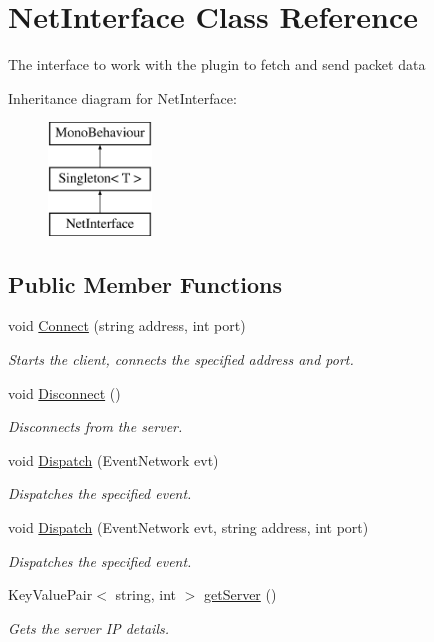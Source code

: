 \hypertarget{class_net_interface}{\section{Net\-Interface Class Reference}
\label{class_net_interface}
}


The interface to work with the plugin to fetch and send packet data  


Inheritance diagram for Net\-Interface\-:\begin{figure}[H]
\begin{center}
\leavevmode
\includegraphics[height=3.000000cm]{class_net_interface}
\end{center}
\end{figure}
\subsection*{Public Member Functions}
\begin{DoxyCompactItemize}
\item 
void \hyperlink{class_net_interface_a565fb35ea7ed5e364902aa8bd0bc6bf9}{Connect} (string address, int port)
\begin{DoxyCompactList}\small\item\em Starts the client, connects the specified address and port. \end{DoxyCompactList}\item 
void \hyperlink{class_net_interface_ae0be68e392f32d422325ac54fcaa7cae}{Disconnect} ()
\begin{DoxyCompactList}\small\item\em Disconnects from the server. \end{DoxyCompactList}\item 
void \hyperlink{class_net_interface_a3ed4f694a9f2083af9ea38ed2a554404}{Dispatch} (Event\-Network evt)
\begin{DoxyCompactList}\small\item\em Dispatches the specified event. \end{DoxyCompactList}\item 
void \hyperlink{class_net_interface_a0cf4580da2218baff890af79fd606722}{Dispatch} (Event\-Network evt, string address, int port)
\begin{DoxyCompactList}\small\item\em Dispatches the specified event. \end{DoxyCompactList}\item 
Key\-Value\-Pair$<$ string, int $>$ \hyperlink{class_net_interface_a18dfbf82b7c690b9abf4ae9ed9aaddcd}{get\-Server} ()
\begin{DoxyCompactList}\small\item\em Gets the server I\-P details. \end{DoxyCompactList}\end{DoxyCompactItemize}
